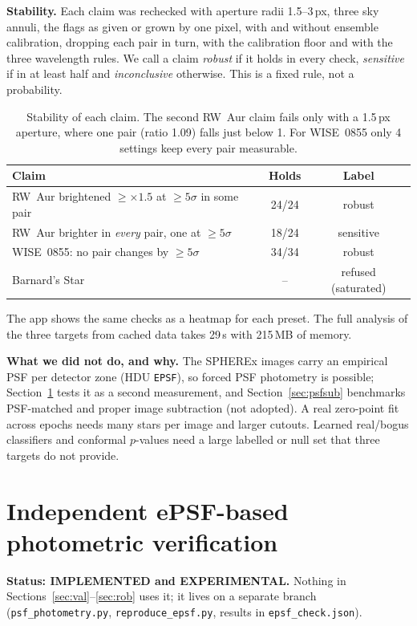 \documentclass[11pt,a4paper]{article}
\begin{document}
\textbf{Stability.} Each claim was rechecked with aperture radii 1.5--3\,px, three sky annuli, the flags as given or
grown by one pixel, with and without ensemble calibration, dropping each pair in turn, with the calibration floor
and with the three wavelength rules. We call a claim \emph{robust} if it holds in every check, \emph{sensitive} if in
at least half and \emph{inconclusive} otherwise. This is a fixed rule, not a probability.
\begin{table}[h]\centering\small
\begin{tabular}{lcc}\toprule
Claim & Holds & Label\\\midrule
RW~Aur brightened $\ge\times1.5$ at $\ge5\sigma$ in some pair & 24/24 & robust\\
RW~Aur brighter in \emph{every} pair, one at $\ge5\sigma$ & 18/24 & sensitive\\
WISE~0855: no pair changes by $\ge5\sigma$ & 34/34 & robust\\
Barnard's Star & -- & refused (saturated)\\\bottomrule
\end{tabular}
\caption{Stability of each claim. The second RW~Aur claim fails only with a 1.5\,px aperture, where one pair
(ratio 1.09) falls just below 1. For WISE~0855 only 4 settings keep every pair measurable.}
\label{tab:rob}
\end{table}
The app shows the same checks as a heatmap for each preset. The full analysis of the three targets from cached data
takes 29\,s with 215\,MB of memory.

\textbf{What we did not do, and why.} The SPHEREx images carry an empirical PSF per detector zone (HDU \texttt{EPSF}),
so forced PSF photometry is possible; Section~\ref{sec:epsf} tests it as a second measurement, and
Section~\ref{sec:psfsub} benchmarks PSF-matched and proper image subtraction \parencite{zackay2016} (not adopted). A real zero-point fit across epochs \parencite[ubercalibration,][]{padmanabhan2008} needs many stars per
image and larger cutouts. Learned real/bogus classifiers \parencite{duev2019,mahabal2019} and conformal $p$-values
\parencite{bates2023} need a large labelled or null set that three targets do not provide.

\section{Independent ePSF-based photometric verification}\label{sec:epsf}
\textbf{Status: IMPLEMENTED and EXPERIMENTAL.} Nothing in Sections~\ref{sec:val}--\ref{sec:rob} uses it; it lives on a
separate branch (\texttt{psf\_photometry.py}, \texttt{reproduce\_epsf.py}, results in \texttt{epsf\_check.json}).
\end{document}
